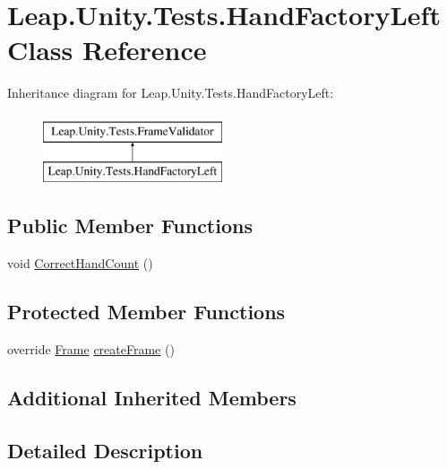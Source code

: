 \hypertarget{class_leap_1_1_unity_1_1_tests_1_1_hand_factory_left}{}\section{Leap.\+Unity.\+Tests.\+Hand\+Factory\+Left Class Reference}
\label{class_leap_1_1_unity_1_1_tests_1_1_hand_factory_left}
Inheritance diagram for Leap.\+Unity.\+Tests.\+Hand\+Factory\+Left\+:\begin{figure}[H]
\begin{center}
\leavevmode
\includegraphics[height=2.000000cm]{class_leap_1_1_unity_1_1_tests_1_1_hand_factory_left}
\end{center}
\end{figure}
\subsection*{Public Member Functions}
\begin{DoxyCompactItemize}
\item 
void \mbox{\hyperlink{class_leap_1_1_unity_1_1_tests_1_1_hand_factory_left_a6783dd99b0fda3636aa43e7512ecf4dc}{Correct\+Hand\+Count}} ()
\end{DoxyCompactItemize}
\subsection*{Protected Member Functions}
\begin{DoxyCompactItemize}
\item 
override \mbox{\hyperlink{class_leap_1_1_frame}{Frame}} \mbox{\hyperlink{class_leap_1_1_unity_1_1_tests_1_1_hand_factory_left_aee2926151ba99102d58cbefb2a029b06}{create\+Frame}} ()
\end{DoxyCompactItemize}
\subsection*{Additional Inherited Members}


\subsection{Detailed Description}


